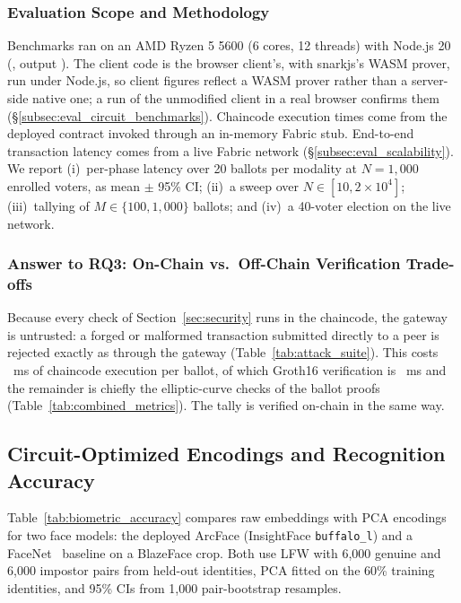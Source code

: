\documentclass[10pt,letterpaper,journal]{IEEEtran}
\begin{document}
\subsubsection{Evaluation Scope and Methodology}
Benchmarks ran on an AMD Ryzen 5 5600 (6 cores, 12 threads) with Node.js 20 (, output ). The client code is the browser client's, with snarkjs's WASM prover, run under Node.js, so client figures reflect a WASM prover rather than a server-side native one; a run of the unmodified client in a real browser confirms them (\S\ref{subsec:eval_circuit_benchmarks}). Chaincode execution times come from the deployed contract invoked through an in-memory Fabric stub. End-to-end transaction latency comes from a live Fabric network (\S\ref{subsec:eval_scalability}). We report (i)~per-phase latency over 20 ballots per modality at $N = 1{,}000$ enrolled voters, as mean $\pm$ 95\% CI; (ii)~a sweep over $N \in [10, 2\times 10^4]$; (iii)~tallying of $M \in \{100, 1{,}000\}$ ballots; and (iv)~a 40-voter election on the live network.

\subsubsection{Answer to RQ3: On-Chain vs.\ Off-Chain Verification Trade-offs}
Because every check of Section~\ref{sec:security} runs in the chaincode, the gateway is untrusted: a forged or malformed transaction submitted directly to a peer is rejected exactly as through the gateway (Table~\ref{tab:attack_suite}). This costs \nCastVoteMs~ms of chaincode execution per ballot, of which Groth16 verification is \nVerifyMs~ms and the remainder is chiefly the elliptic-curve checks of the ballot proofs (Table~\ref{tab:combined_metrics}). The tally is verified on-chain in the same way.


\subsection{Circuit-Optimized Encodings and Recognition Accuracy}
\label{subsec:eval_encoding}

Table~\ref{tab:biometric_accuracy} compares raw embeddings with PCA encodings for two face models: the deployed ArcFace (InsightFace \texttt{buffalo\_l}) and a FaceNet~\cite{Schroff2015} baseline on a BlazeFace crop. Both use LFW with 6,000 genuine and 6,000 impostor pairs from held-out identities, PCA fitted on the 60\% training identities, and 95\% CIs from 1,000 pair-bootstrap resamples.
\end{document}
